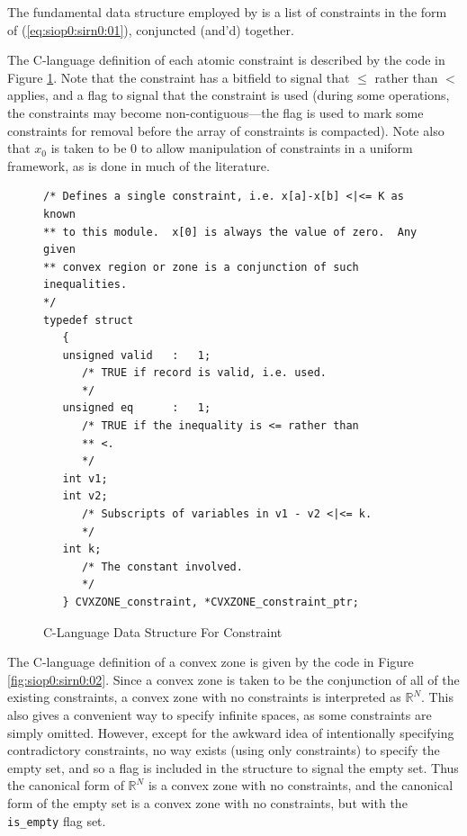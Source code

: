 The fundamental data structure employed by \swname{} is a list of
constraints in the form of (\ref{eq:siop0:sirn0:01}), conjuncted
(and'd) together.  

The C-language definition of each atomic constraint is described by
the code in Figure \ref{fig:siop0:sirn0:01}.  Note that the 
constraint has a bitfield to signal that $\leq$ rather than
$<$ applies, and a flag to signal that the constraint is used
(during some operations, the constraints may become non-contiguous---the
flag is used to mark some constraints for removal before the array of
constraints is compacted).  Note also that $x_0$ is taken to be 
0 to allow manipulation of constraints in a uniform framework, 
as is done in much of the literature.

\begin{figure}
\begin{small}
\begin{verbatim}
/* Defines a single constraint, i.e. x[a]-x[b] <|<= K as known
** to this module.  x[0] is always the value of zero.  Any given
** convex region or zone is a conjunction of such inequalities.
*/
typedef struct
   {
   unsigned valid   :   1;
      /* TRUE if record is valid, i.e. used.
      */
   unsigned eq      :   1;
      /* TRUE if the inequality is <= rather than
      ** <.
      */
   int v1; 
   int v2;
      /* Subscripts of variables in v1 - v2 <|<= k.
      */
   int k;
      /* The constant involved.
      */
   } CVXZONE_constraint, *CVXZONE_constraint_ptr;
\end{verbatim}
\end{small}
\caption{C-Language Data Structure For Constraint}
\label{fig:siop0:sirn0:01}
\end{figure}

The C-language definition of a convex zone is given by the 
code in Figure \ref{fig:siop0:sirn0:02}.  Since a convex zone
is taken to be the conjunction of all of the existing constraints,
a convex zone with no constraints is interpreted as $\mathbb{R}^N$.
This also gives a convenient way to specify infinite spaces, as 
some constraints are simply omitted.
However, except for the awkward idea of intentionally
specifying contradictory
constraints, no way exists (using only constraints) to specify
the empty set, and so a flag is included in the structure to 
signal the empty set.  Thus the canonical form of $\mathbb{R}^N$
is a convex zone with no constraints, and the canonical form
of the empty set is a convex zone with no constraints, but with the
\texttt{is\_empty} flag set.

